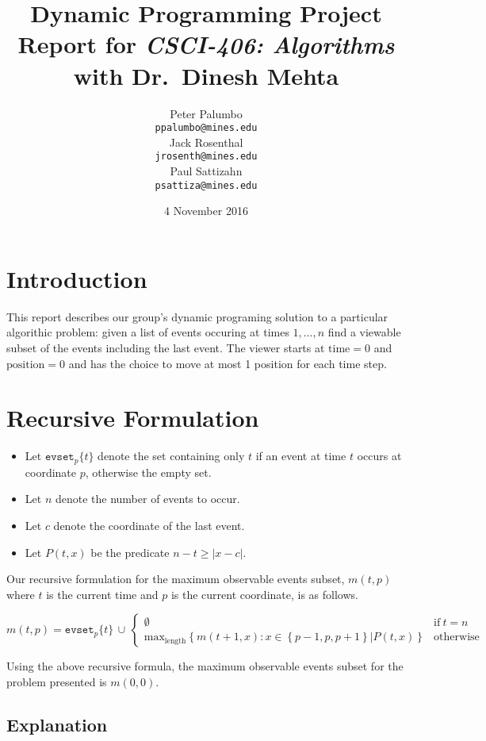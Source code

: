 \documentclass[titlepage,12pt]{article}
\title{\textbf{Dynamic Programming Project} \\ {\small Report for \emph{CSCI-406:
Algorithms} with Dr.~Dinesh Mehta}}
\author{%
    Peter Palumbo \\ {\small\texttt{ppalumbo@mines.edu}} \\[12pt]
    Jack Rosenthal \\ {\small\texttt{jrosenth@mines.edu}} \\[12pt]
    Paul Sattizahn \\ {\small\texttt{psattiza@mines.edu}} \\
}
\date{4 November 2016}
\let\ge=\geqslant
\begin{document}
\maketitle
\section{Introduction}

This report describes our group's dynamic programing solution to a particular
algorithic problem: given a list of events occuring at times $1,\ldots,n$ find
a viewable subset of the events including the last event. The viewer starts at
$\text{time}=0$ and $\text{position}=0$ and has the choice to move at most 1
position for each time step.

\section{Recursive Formulation}

\begin{itemize}
    \item Let $\mathtt{evset}_p\{t\}$ denote the set containing only $t$ if an event
        at time $t$ occurs at coordinate $p$, otherwise the empty set.
    \item Let $n$ denote the number of events to occur.
    \item Let $c$ denote the coordinate of the last event.
    \item Let $P(t, x)$ be the predicate $n - t \ge |x - c|$.
\end{itemize}

Our recursive formulation for the maximum observable events subset, $m(t, p)$
where $t$ is the current time and $p$ is the current coordinate, is as
follows.

\begin{displaymath}
    m(t, p) = \mathtt{evset}_p\{t\}\, \cup\,
    \begin{cases}
        \emptyset & \text{if}\ t = n \\
        \text{max}_{\text{length}} \left\{m(t + 1, x) :
        x \in \left\{p - 1, p, p + 1\right\} | P(t, x)
        \right\} & \text{otherwise}
    \end{cases}
\end{displaymath}

Using the above recursive formula, the maximum observable events subset for the
problem presented is $m(0, 0)$.

\subsection{Explanation}
\end{document}
